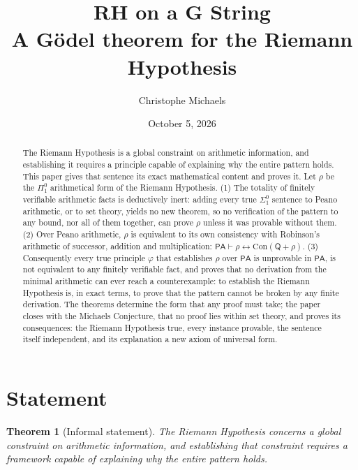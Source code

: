 \documentclass[11pt]{article}
\title{RH on a G String\\ \large A G\"odel theorem for the Riemann Hypothesis}
\author{Christophe Michaels}
\date{October 5, 2026}
\newtheorem{theorem}{Theorem}[section]
\theoremstyle{definition}
\theoremstyle{remark}
\newcommand{\PA}{\mathsf{PA}}
\newcommand{\RA}{\mathsf{Q}}
\newcommand{\Con}{\mathrm{Con}}
\newcommand{\Pione}{\Pi^0_1}
\newcommand{\Sigone}{\Sigma^0_1}
\begin{document}
\maketitle

\begin{abstract}
\noindent The Riemann Hypothesis is a global constraint on arithmetic information, and establishing it requires a principle capable of explaining why the entire pattern holds. This paper gives that sentence its exact mathematical content and proves it. Let $\rho$ be the $\Pione$ arithmetical form of the Riemann Hypothesis. (1) The totality of finitely verifiable arithmetic facts is deductively inert: adding every true $\Sigone$ sentence to Peano arithmetic, or to set theory, yields no new theorem, so no verification of the pattern to any bound, nor all of them together, can prove $\rho$ unless it was provable without them. (2) Over Peano arithmetic, $\rho$ is equivalent to its own consistency with Robinson's arithmetic of successor, addition and multiplication: $\PA\vdash\rho\leftrightarrow\Con(\RA+\rho)$. (3) Consequently every true principle $\varphi$ that establishes $\rho$ over $\PA$ is unprovable in $\PA$, is not equivalent to any finitely verifiable fact, and proves that no derivation from the minimal arithmetic can ever reach a counterexample: to establish the Riemann Hypothesis is, in exact terms, to prove that the pattern cannot be broken by any finite derivation. The theorems determine the form that any proof must take; the paper closes with the Michaels Conjecture, that no proof lies within set theory, and proves its consequences: the Riemann Hypothesis true, every instance provable, the sentence itself independent, and its explanation a new axiom of universal form.
\end{abstract}

\section{Statement}

\begin{theorem}[Informal statement]\label{thm:informal}
The Riemann Hypothesis concerns a global constraint on arithmetic information, and establishing that constraint requires a framework capable of explaining why the entire pattern holds.
\end{theorem}
\end{document}
